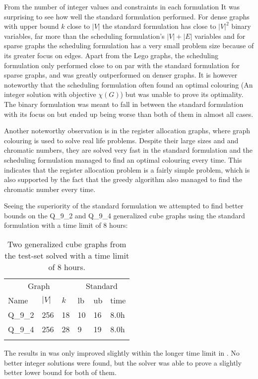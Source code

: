 \noindent From the number of integer values and constraints in each formulation It was surprising to see how well the standard formulation performed. For dense graphs with upper bound $k$ close to $|V|$ the standard formulation has close to $|V|^2$ binary variables, far more than the scheduling formulation's $|V|+|E|$ variables and for sparse graphs the scheduling formulation has a very small problem size because of its greater focus on edges. Apart from the Lego graphs, the scheduling formulation only performed close to on par with the standard formulation for sparse graphs, and was greatly outperformed on denser graphs. It is however noteworthy that the scheduling formulation often found an optimal colouring (An integer solution with objective $\chi (G)$) but was unable to prove its optimality. The binary formulation was meant to fall in between the standard formulation with its focus on  but ended up being worse than both of them in almost all cases.

\noindent Another noteworthy observation is in the register allocation graphs, where graph colouring is used to solve real life problems. Despite their large sizes and and chromatic numbers, they are solved very fast in the standard formulation and the scheduling formulation managed to find an optimal colouring every time. This indicates that the register allocation problem is a fairly simple problem, which is also supported by the fact that the greedy algorithm also managed to find the chromatic number every time.

\noindent Seeing the superiority of the standard formulation we attempted to find better bounds on the Q\_9\_2 and Q\_9\_4 generalized cube graphs using the standard formulation with a time limit of 8 hours:
\iffalse
\todo{Standard - fast,
Scheduling - medium,
Binary - slow.
Maybe a bigger number of binary variables result in tighter relaxation}
\todo{(number of variables and constraints), the tightness of the formulation (the gap between integer optimal value and the optimal value of linear relaxation)}
\fi

\begin{centering}
\begin{longtable}{|lll|lll|}
\hline
\multicolumn{3}{|c|}{Graph}&\multicolumn{3}{c|}{Standard}\\
Name&$|V|$&$k$&lb&ub&time\\
\hline
Q\_9\_2&256&18&10&16&8.0h\\
\hline 
Q\_9\_4&256&28&9&19&8.0h\\
\hline
\caption{Two generalized cube graphs from the test-set solved with a time limit of 8 hours.}
\label{table2}
\end{longtable}
\end{centering}
\noindent The results in  was only improved slightly within the longer time limit in . No better integer solutions were found, but the solver was able to prove a slightly better lower bound for both of them.
